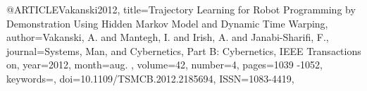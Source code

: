 @ARTICLE{Vakanski2012,
title={Trajectory Learning for Robot Programming by Demonstration Using Hidden Markov Model and Dynamic Time Warping},
author={Vakanski, A. and Mantegh, I. and Irish, A. and Janabi-Sharifi, F.},
journal={Systems, Man, and Cybernetics, Part B: Cybernetics, IEEE Transactions on}, 
year={2012},
month={aug. },
volume={42},
number={4},
pages={1039 -1052},
keywords={},
doi={10.1109/TSMCB.2012.2185694},
ISSN={1083-4419},}
